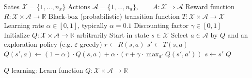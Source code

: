 \documentclass{article}
\begin{document}
\begin{preview}
    \begin{algorithm}[H]
        \begin{algorithmic}
        \Require
        \Statex Sates $\mathcal{X} = \{1, \dots, n_x\}$
        \Statex Actions $\mathcal{A} = \{1, \dots, n_a\},\qquad A: \mathcal{X} \Rightarrow \mathcal{A}$
        \Statex Reward function $R: \mathcal{X} \times \mathcal{A} \rightarrow \mathbb{R}$
        \Statex Black-box (probabilistic) transition function $T: \mathcal{X} \times \mathcal{A} \rightarrow \mathcal{X}$
        \Statex Learning rate $\alpha \in [0, 1]$, typically $\alpha = 0.1$
        \Statex Discounting factor $\gamma \in [0, 1]$
            \State Initialize $Q: \mathcal{X} \times \mathcal{A} \rightarrow \mathbb{R}$ arbitrarily
                \State Start in state $s \in \mathcal{X}$
                    \State Select $a \in \mathcal{A}$ by $Q$ and an exploration policy (e.g. $\varepsilon$ greedy)
                    \State $r \gets R(s, a)$
                    \State $s' \gets T(s, a)$ 
                    \State $Q(s', a) \gets (1 - \alpha) \cdot Q(s, a) + \alpha \cdot (r + \gamma \cdot \max_{a'} Q(s', a'))$
                    \State $s \gets s'$
                \EndWhile
            \EndWhile
            \Return $Q$
        \EndProcedure
        \end{algorithmic}
    \caption{$Q$-learning: Learn function $Q: \mathcal{X} \times \mathcal{A} \rightarrow \mathbb{R}$}
    \label{alg:q-learning}
    \end{algorithm}
\end{preview}
\end{document}
